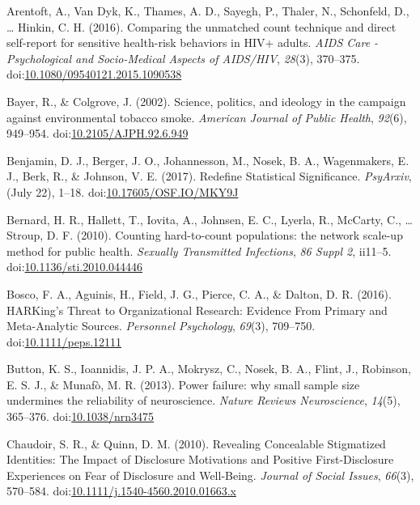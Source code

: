 \documentclass[jou]{apa6}
\theoremstyle{definition}
\theoremstyle{definition}
\theoremstyle{definition}
\theoremstyle{remark}
\begin{document}
\hypertarget{ref-Arentoft2016}{}
Arentoft, A., Van Dyk, K., Thames, A. D., Sayegh, P., Thaler, N.,
Schonfeld, D., \ldots{} Hinkin, C. H. (2016). Comparing the unmatched
count technique and direct self-report for sensitive health-risk
behaviors in HIV+ adults. \emph{AIDS Care - Psychological and
Socio-Medical Aspects of AIDS/HIV}, \emph{28}(3), 370--375.
doi:\href{https://doi.org/10.1080/09540121.2015.1090538}{10.1080/09540121.2015.1090538}

\hypertarget{ref-Bayer2002}{}
Bayer, R., \& Colgrove, J. (2002). Science, politics, and ideology in
the campaign against environmental tobacco smoke. \emph{American Journal
of Public Health}, \emph{92}(6), 949--954.
doi:\href{https://doi.org/10.2105/AJPH.92.6.949}{10.2105/AJPH.92.6.949}

\hypertarget{ref-Benjamin2017}{}
Benjamin, D. J., Berger, J. O., Johannesson, M., Nosek, B. A.,
Wagenmakers, E. J., Berk, R., \& Johnson, V. E. (2017). Redefine
Statistical Significance. \emph{PsyArxiv}, (July 22), 1--18.
doi:\href{https://doi.org/10.17605/OSF.IO/MKY9J}{10.17605/OSF.IO/MKY9J}

\hypertarget{ref-Bernard2010}{}
Bernard, H. R., Hallett, T., Iovita, A., Johnsen, E. C., Lyerla, R.,
McCarty, C., \ldots{} Stroup, D. F. (2010). Counting hard-to-count
populations: the network scale-up method for public health.
\emph{Sexually Transmitted Infections}, \emph{86 Suppl 2}, ii11--5.
doi:\href{https://doi.org/10.1136/sti.2010.044446}{10.1136/sti.2010.044446}

\hypertarget{ref-Bosco2016}{}
Bosco, F. A., Aguinis, H., Field, J. G., Pierce, C. A., \& Dalton, D. R.
(2016). HARKing's Threat to Organizational Research: Evidence From
Primary and Meta-Analytic Sources. \emph{Personnel Psychology},
\emph{69}(3), 709--750.
doi:\href{https://doi.org/10.1111/peps.12111}{10.1111/peps.12111}

\hypertarget{ref-Button2013}{}
Button, K. S., Ioannidis, J. P. A., Mokrysz, C., Nosek, B. A., Flint,
J., Robinson, E. S. J., \& Munafò, M. R. (2013). Power failure: why
small sample size undermines the reliability of neuroscience.
\emph{Nature Reviews Neuroscience}, \emph{14}(5), 365--376.
doi:\href{https://doi.org/10.1038/nrn3475}{10.1038/nrn3475}

\hypertarget{ref-Chaudoir2010}{}
Chaudoir, S. R., \& Quinn, D. M. (2010). Revealing Concealable
Stigmatized Identities: The Impact of Disclosure Motivations and
Positive First-Disclosure Experiences on Fear of Disclosure and
Well-Being. \emph{Journal of Social Issues}, \emph{66}(3), 570--584.
doi:\href{https://doi.org/10.1111/j.1540-4560.2010.01663.x}{10.1111/j.1540-4560.2010.01663.x}
\end{document}
